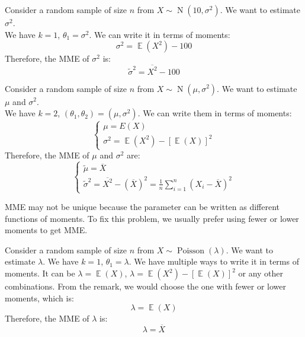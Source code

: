 \documentclass{huhtakm-template-book-v2}
\DeclareMathOperator{\E}{\mathbb{E}}
\DeclareMathOperator{\Poisson}{Poisson}
\DeclareMathOperator{\N}{N}
\begin{document}
\newpage
\begin{eg}
	Consider a random sample of size $n$ from $X\sim\N(10,\sigma^{2})$. We want to estimate $\sigma^{2}$.\\
	We have $k=1$, $\theta_{1}=\sigma^{2}$. We can write it in terms of moments:
	\begin{equation*}
		\sigma^{2}=\E(X^{2})-100
	\end{equation*}
	Therefore, the MME of $\sigma^{2}$ is:
	\begin{equation*}
		\widetilde{\sigma}^{2}=\overline{X^{2}}-100
	\end{equation*}
\end{eg}
\begin{eg}
	Consider a random sample of size $n$ from $X\sim\N(\mu,\sigma^{2})$. We want to estimate $\mu$ and $\sigma^{2}$.\\
	We have $k=2$, $(\theta_{1},\theta_{2})=(\mu,\sigma^{2})$. We can write them in terms of moments: 
	\begin{equation*}
		\begin{cases}
			\mu=E(X)\\
			\sigma^{2}=\E(X^{2})-[\E(X)]^{2}
		\end{cases}
	\end{equation*}
	Therefore, the MME of $\mu$ and $\sigma^{2}$ are:
	\begin{equation*}
		\begin{cases}
			\widetilde{\mu}=\overline{X}\\
			\widetilde{\sigma}^{2}=\overline{X^{2}}-(\overline{X})^{2}=\frac{1}{n}\sum_{i=1}^{n}(X_{i}-\overline{X})^{2}
		\end{cases}
	\end{equation*}
\end{eg}
\begin{rem}
	MME may not be unique because the parameter can be written as different functions of moments. To fix this problem, we usually prefer using fewer or lower moments to get MME.
\end{rem}
\begin{eg}
	Consider a random sample of size $n$ from $X\sim\Poisson(\lambda)$. We want to estimate $\lambda$. We have $k=1$, $\theta_{1}=\lambda$. We have multiple ways to write it in terms of moments. It can be $\lambda=\E(X)$, $\lambda=\E(X^{2})-[\E(X)]^{2}$ or any other combinations. From the remark, we would choose the one with fewer or lower moments, which is:
	\begin{equation*}
		\lambda=\E(X)
	\end{equation*}
	Therefore, the MME of $\lambda$ is:
	\begin{equation*}
		\lambda=\overline{X}
	\end{equation*}
\end{eg}
\end{document}
